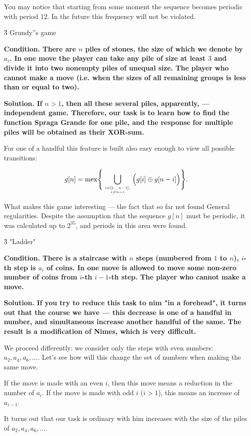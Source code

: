 You may notice that starting from some moment the sequence becomes periodic with period $12$. In the future this frequency will not be violated.


\h3{ Grundy''s game }

\bf{Condition}. There are $n$ piles of stones, the size of which we denote by $a_i$. In one move the player can take any pile of size at least $3$ and divide it into two nonempty piles of unequal size. The player who cannot make a move (i.e. when the sizes of all remaining groups is less than or equal to two).

\bf{Solution}. If $n > 1$, then all these several piles, apparently, --- independent game. Therefore, our task is to learn how to find the function Spraga Grande for one pile, and the response for multiple piles will be obtained as their XOR-sum.

For one of a handful this feature is built also easy enough to view all possible transitions:

$$ g[n] = {\rm mex} \Bigg\{ \bigcup_{i=[1 \ldots n-1], \atop i \ne n-i } \Big( g[i] \oplus g[n-i] \Big) \Bigg\}. $$

What makes this game interesting --- the fact that so far not found General regularities. Despite the assumption that the sequence $g[n]$ must be periodic, it was calculated up to $2^{35}$, and periods in this area were found.


\h3{ "Ladder" }

\bf{Condition}. There is a staircase with $n$ steps (numbered from $1$ to $n$), $i$-th step is $a_i$ of coins. In one move is allowed to move some non-zero number of coins from $i$-th $i-1$-th step. The player who cannot make a move.

\bf{Solution}. If you try to reduce this task to nim "in a forehead", it turns out that the course we have --- this decrease is one of a handful in number, and simultaneous increase another handful of the same. The result is a modification of Nimes, which is very difficult.

We proceed differently: we consider only the steps with even numbers: $a_2, a_4, a_6, \ldots$. Let's see how will this change the set of numbers when making the same move.

If the move is made with an even $i$, then this move means a reduction in the number of $a_i$. If the move is made with odd $i$ ($i > 1$), this means an increase of $a_{i-1}$.

It turns out that our task is ordinary with him increases with the size of the piles of $a_2, a_4, a_6, \ldots$.


